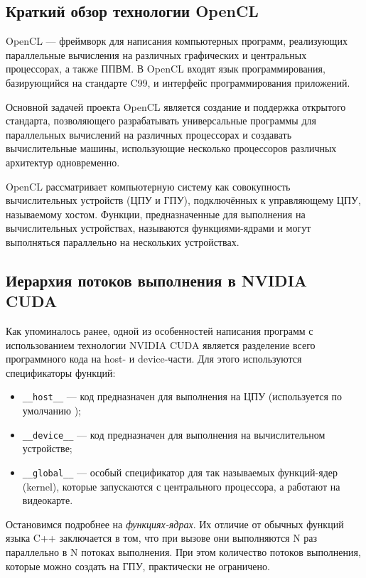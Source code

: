 \subsection{Краткий обзор технологии OpenCL}

OpenCL --- фреймворк для написания компьютерных программ, реализующих
параллельные вычисления на различных графических и центральных
процессорах, а также ППВМ. В OpenCL входят язык программирования, базирующийся на стандарте C99, и интерфейс программирования приложений.

Основной задачей проекта OpenCL является создание и поддержка открытого стандарта, позволяющего разрабатывать универсальные программы для параллельных вычислений на различных процессорах и создавать вычислительные машины,
использующие несколько процессоров различных архитектур одновременно.

OpenCL рассматривает компьютерную систему как совокупность вычислительных устройств (ЦПУ и ГПУ), подключённых к управляющему ЦПУ, называемому хостом. Функции, предназначенные для выполнения на вычислительных устройствах, называются функциями-ядрами и могут выполняться параллельно на нескольких устройствах.

\subsection{Иерархия потоков выполнения в NVIDIA CUDA}

Как упоминалось ранее, одной из особенностей написания программ с использованием технологии NVIDIA CUDA является разделение всего программного кода
на host- и device-части. Для этого используются спецификаторы функций:
\begin{itemize}
\item \texttt{\_\_host\_\_} --- код предназначен для выполнения на ЦПУ (используется по умолчанию );
\item \texttt{\_\_device\_\_} --- код предназначен для выполнения на вычислительном устройстве;
\item \texttt{\_\_global\_\_} --- особый спецификатор для так называемых функций-ядер (kernel), которые запускаются с центрального процессора, а работают на видеокарте.
\end{itemize}

Остановимся подробнее на \textit{функциях-ядрах}. Их отличие от обычных
функций языка C++ заключается в том, что при вызове они выполняются N раз
параллельно в N потоках выполнения. При этом количество потоков выполнения, которые можно создать на ГПУ, практически не ограничено.

